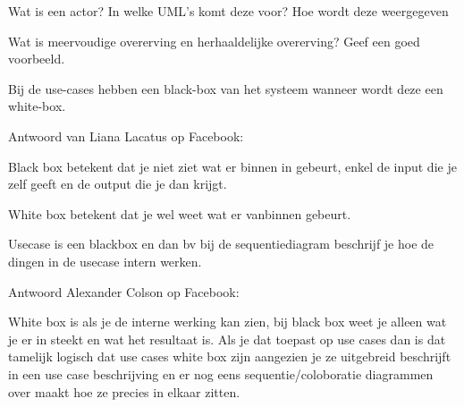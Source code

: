 \begin{question}

\end{question}

\begin{solution}[print]

\end{solution}

\begin{question}
Wat is een actor? In welke UML's komt deze voor? Hoe wordt deze weergegeven
\end{question}

\begin{solution}[print]

\end{solution}

\begin{question}
Wat is meervoudige overerving en herhaaldelijke overerving? Geef een goed voorbeeld.
\end{question}

\begin{solution}[print]

\end{solution}

\begin{question}
Bij de use-cases hebben een black-box van het systeem wanneer wordt deze een white-box.
\end{question}

\begin{solution}[print]

Antwoord van Liana Lacatus op Facebook:

Black box betekent dat je niet ziet wat er binnen in gebeurt, enkel de input die je zelf geeft en de output die je dan krijgt.

White box betekent dat je wel weet wat er vanbinnen gebeurt. 

Usecase is een blackbox en dan bv bij de sequentiediagram beschrijf je hoe de dingen in de usecase intern werken.

Antwoord Alexander Colson op Facebook:

 White box is als je de interne werking kan zien, bij black box weet je alleen wat je er in steekt en wat het resultaat is. Als je dat toepast op use cases dan is dat tamelijk logisch dat use cases white box zijn aangezien je ze uitgebreid beschrijft in een use case beschrijving en er nog eens sequentie/coloboratie diagrammen over maakt hoe ze precies in elkaar zitten.

\end{solution}

